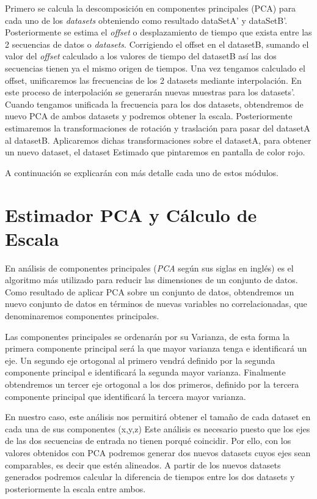 Primero se calcula la descomposición en componentes principales (PCA) para cada uno de los \textit{datasets} obteniendo como resultado dataSetA' y dataSetB'. Posteriormente se estima el \textit{offset} o desplazamiento de tiempo que exista entre las 2 secuencias de datos o \textit{datasets}. Corrigiendo el offset en el datasetB, sumando el valor del \textit{offset} calculado a los valores de tiempo del datasetB así las dos secuencias tienen ya el mismo origen de tiempos. Una vez tengamos calculado el offset, unificaremos las frecuencias de los 2 datasets mediante interpolación. En este proceso de interpolación se generarán nuevas muestras para los datasets'.
Cuando tengamos unificada la frecuencia para los dos datasets, obtendremos de nuevo PCA de ambos datasets y podremos obtener la escala.
Posteriormente estimaremos la transformaciones de rotación y traslación para pasar del datasetA al datasetB. Aplicaremos dichas transformaciones sobre el datasetA, para obtener un nuevo dataset, el dataset Estimado que pintaremos en pantalla de color rojo.

A continuación se explicarán con más detalle cada uno de estos módulos.


\section{Estimador PCA y Cálculo de Escala}
    En análisis de componentes principales (\textit{PCA} según sus siglas en inglés) es el algoritmo más utilizado para reducir las dimensiones de un conjunto de datos. Como resultado de aplicar PCA sobre un conjunto de datos, obtendremos un nuevo conjunto de datos en términos de nuevas variables no correlacionadas, que denominaremos componentes principales.

    Las componentes principales se ordenarán por su Varianza, de esta forma la primera componente principal será la que mayor varianza tenga e identificará un eje. Un segundo eje ortogonal al primero vendrá definido por la segunda componente principal e identificará la segunda mayor varianza. Finalmente obtendremos un tercer eje ortogonal a los dos primeros, definido por la tercera componente principal que identificará la tercera mayor varianza.

    En nuestro caso, este análisis nos permitirá obtener el tamaño de cada dataset en cada una de sus componentes (x,y,z)
	Este análisis es necesario puesto que los ejes de las dos secuencias de entrada no tienen porqué coincidir. Por ello, con los valores obtenidos con PCA podremos generar dos nuevos datasets cuyos ejes sean comparables, es decir que estén alineados. A partir de los nuevos datasets generados podremos calcular la diferencia de tiempos entre los dos datasets y posteriormente la escala entre ambos.
 
